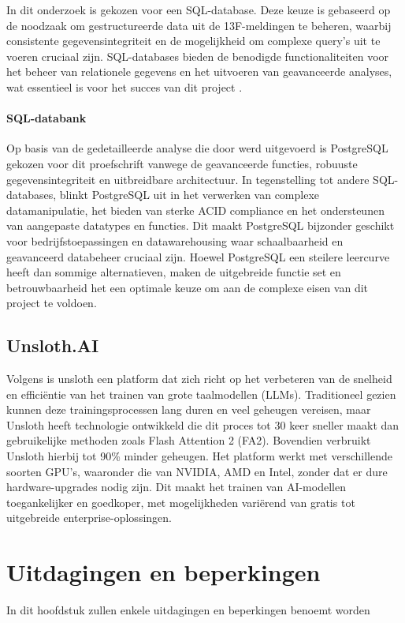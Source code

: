 In dit onderzoek is gekozen voor een SQL-database. Deze keuze is gebaseerd op de noodzaak om gestructureerde data uit de 13F-meldingen te beheren, waarbij consistente gegevensintegriteit en de mogelijkheid om complexe query’s uit te voeren cruciaal zijn. SQL-databases bieden de benodigde functionaliteiten voor het beheer van relationele gegevens en het uitvoeren van geavanceerde analyses, wat essentieel is voor het succes van dit project \autocite{khan2023performance}.

\paragraph{SQL-databank}
Op basis van de gedetailleerde analyse die door \autocite{Javija2024} werd uitgevoerd is PostgreSQL gekozen voor dit proefschrift vanwege de geavanceerde functies, robuuste gegevensintegriteit en uitbreidbare architectuur. In tegenstelling tot andere SQL-databases, blinkt PostgreSQL uit in het verwerken van complexe datamanipulatie, het bieden van sterke ACID compliance en het ondersteunen van aangepaste datatypes en functies. Dit maakt PostgreSQL bijzonder geschikt voor bedrijfstoepassingen en datawarehousing waar schaalbaarheid en geavanceerd databeheer cruciaal zijn. Hoewel PostgreSQL een steilere leercurve heeft dan sommige alternatieven, maken de uitgebreide functie set en betrouwbaarheid het een optimale keuze om aan de complexe eisen van dit project te voldoen.
\subsection{Unsloth.AI}
Volgens \textcite{unsloth2024} is unsloth een platform dat zich richt op het verbeteren van de snelheid en efficiëntie van het trainen van grote taalmodellen (LLMs). Traditioneel gezien kunnen deze trainingsprocessen lang duren en veel geheugen vereisen, maar Unsloth heeft technologie ontwikkeld die dit proces tot 30 keer sneller maakt dan gebruikelijke methoden zoals Flash Attention 2 (FA2). Bovendien verbruikt Unsloth hierbij tot 90\% minder geheugen. Het platform werkt met verschillende soorten GPU's, waaronder die van NVIDIA, AMD en Intel, zonder dat er dure hardware-upgrades nodig zijn. Dit maakt het trainen van AI-modellen toegankelijker en goedkoper, met mogelijkheden variërend van gratis tot uitgebreide enterprise-oplossingen.



\section{Uitdagingen en beperkingen}
In dit hoofdstuk zullen enkele uitdagingen en beperkingen benoemt worden
